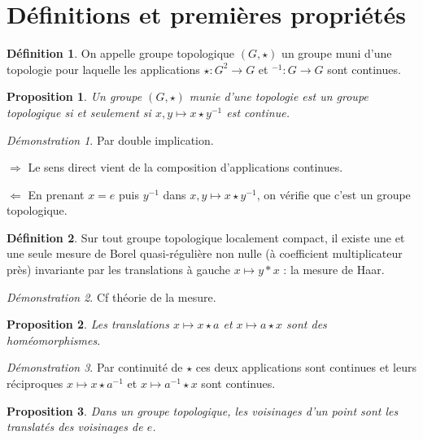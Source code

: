 \documentclass[a4paper, 11pt, french]{book}
\newenvironment{itemise}{\itemize}{\enditemize}
\theoremstyle{plain} %
\newtheorem{proposition}{Proposition}
\theoremstyle{definition} %
\newtheorem{definition}{Définition}
\theoremstyle{remark} %
\newtheorem*{demonstration}{Démonstration}
\newcommand{\1}{\mathds{1}}
\newcommand{\inv}[1]{#1^{-1}}
\newcommand\equivalence[3]{
	\begin{demonstration}
		#1
		\begin{itemise}
			\item[$\Longrightarrow$] #2
			\item[$\Longleftarrow$] #3
		\end{itemise}
	\end{demonstration}
}
\begin{document}
\section{Définitions et premières propriétés}

\begin{definition}
	On appelle groupe topologique $(G, \star)$ un groupe muni d'une topologie pour laquelle les applications $\star:G^2\rightarrow G$ et $\inv{}:G\rightarrow G$ sont continues.
\end{definition}

\begin{proposition}
	Un groupe $(G, \star)$ munie d'une topologie est un groupe topologique si et seulement si $x, y\longmapsto x\star\inv{y}$ est continue.
\end{proposition}

\equivalence{Par double implication.}{
	Le sens direct vient de la composition d'applications continues.
}{
	En prenant $x=e$ puis $\inv{y}$ dans $x, y\longmapsto x\star\inv{y}$, on vérifie que c'est un groupe topologique.
}


\begin{definition}
	Sur tout groupe topologique localement compact, il existe une et une seule mesure de Borel quasi-régulière non nulle (à coefficient multiplicateur près) invariante par les translations à gauche $x\longmapsto y*x$ : la mesure de Haar.
\end{definition}

\begin{demonstration}
	Cf théorie de la mesure.
\end{demonstration}

\begin{proposition}
	Les translations $x\longmapsto x\star a$ et $x\longmapsto a\star x$ sont des homéomorphismes.
\end{proposition}

\begin{demonstration}
	Par continuité de $\star$ ces deux applications sont continues et leurs réciproques $x\longmapsto x\star\inv{a}$ et $x\longmapsto\inv{a}\star x$ sont continues.
\end{demonstration}

\begin{proposition}
	Dans un groupe topologique, les voisinages d’un point sont les translatés des voisinages de $e$.
\end{proposition}
\end{document}
